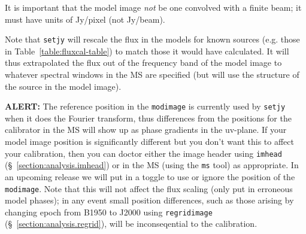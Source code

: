 It is important that the model image {\em not} be one
convolved with a finite beam; it must have units of Jy/pixel (not
Jy/beam).  

Note that {\tt setjy} will rescale the flux in the models for known
sources (e.g. those in Table~\ref{table:fluxcal-table}) to match those
it would have calculated.  It will thus extrapolated the flux out of
the frequency band of the model image to whatever spectral windows
in the MS are specified (but will use the structure of the source
in the model image).

{\bf ALERT:} The reference position in the {\tt modimage} is 
currently used by {\tt setjy} when it does the Fourier transform,
thus differences from the positions for the calibrator in the MS
will show up as phase gradients in the uv-plane.  If your model
image position is significantly different but you don't want this
to affect your calibration, then you can doctor either the image
header using {\tt imhead} (\S~\ref{section:analysis.imhead})
or in the MS (using the {\tt ms} tool) as appropriate.  In an upcoming
release we will put in a toggle to use or ignore the position of
the {\tt modimage}.  Note that this will not affect the flux scaling
(only put in erroneous model phases); in any event small position
differences, such as those arising by changing epoch from B1950 to
J2000 using {\tt regridimage} (\S~\ref{section:analysis.regrid}),
will be inconseqential to the calibration.

